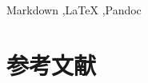\documentclass[final,3p,times,twocolumn,dvipdfmx]{elsarticle}
\begin{document}
\begin{frontmatter}


\begin{abstract}

\end{abstract}
\begin{keyword}
Markdown \sep LaTeX \sep Pandoc
\end{keyword}

\end{frontmatter}




\newpage

\section{参考文献}



\end{document}
